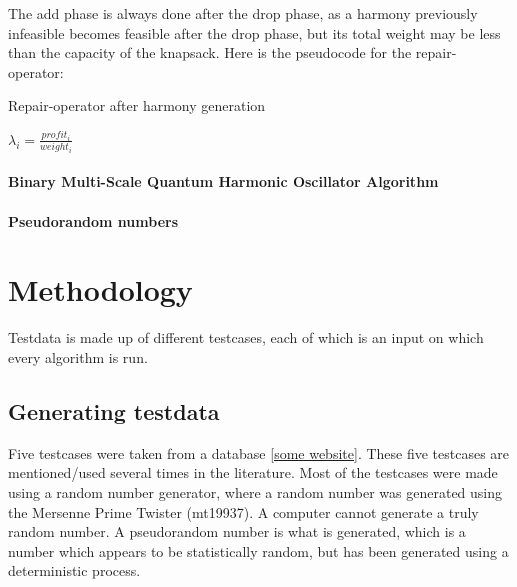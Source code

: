 \documentclass[titlepage]{article}
\begin{document}
The add phase is always done after the drop phase, as a harmony previously infeasible becomes feasible after the drop phase, but its total weight may be less than the capacity of the knapsack. Here is the pseudocode for the repair-operator:

\begin{algorithm}
\caption{Repair-operator after harmony generation}
    \begin{algorithmic}
        \State {}
            \State $\lambda_{i} = \frac{profit_{i}}{weight_{i}}$
        \EndFor
        \State {}
        \State {}
        
        \EndIf
    \end{algorithmic}
\end{algorithm}

\paragraph*{Binary Multi-Scale Quantum Harmonic Oscillator Algorithm}

\paragraph{Pseudorandom numbers}


\section{Methodology}

Testdata is made up of different testcases, each of which is an input on which every algorithm is run.

\subsection{Generating testdata}

Five testcases were taken from a database \ref{some website}. These five testcases are mentioned/used several times in the literature.  Most of the testcases were made using a random number generator, where a random number was generated using the Mersenne Prime Twister (mt19937). A computer cannot generate a truly random number. A pseudorandom number is what is generated, which is a number which appears to be statistically random, but has been generated using a deterministic process. 
\end{document}
